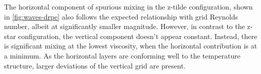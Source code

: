 The horizontal component of spurious mixing in the z-tilde configuration, shown in \cref{fig:waves-drpe} also follows the expected relationship with grid Reynolds number, albeit at significantly smaller magnitude. However, in contrast to the z-star configuration, the vertical component doesn't appear constant. Instead, there is significant mixing at the lowest viscosity, when the horizontal contribution is at a minimum. As the horizontal layers are conforming well to the temperature structure, larger deviations of the vertical grid are present.
